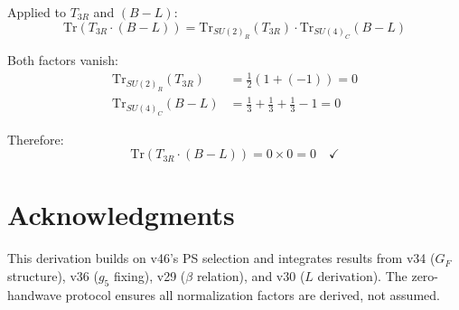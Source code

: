 \documentclass[11pt,a4paper]{article}
\begin{document}
Applied to $T_{3R}$ and $(B-L)$:
\begin{equation}
\label{eq:cross-trace}
\mathrm{Tr}(T_{3R} \cdot (B-L)) = \mathrm{Tr}_{SU(2)_R}(T_{3R}) \cdot \mathrm{Tr}_{SU(4)_C}(B-L)
\end{equation}

Both factors vanish:
\begin{align}
\label{eq:t3r-traceless}
\mathrm{Tr}_{SU(2)_R}(T_{3R}) &= \frac{1}{2}(1 + (-1)) = 0 \\
\label{eq:bl-traceless-app}
\mathrm{Tr}_{SU(4)_C}(B-L) &= \frac{1}{3} + \frac{1}{3} + \frac{1}{3} - 1 = 0
\end{align}

Therefore:
\begin{equation}
\label{eq:cross-vanish}
\mathrm{Tr}(T_{3R} \cdot (B-L)) = 0 \times 0 = 0 \quad \checkmark
\end{equation}

\section*{Acknowledgments}

This derivation builds on v46's PS selection and integrates results from
v34 ($G_F$ structure), v36 ($g_5$ fixing), v29 ($\beta$ relation), and v30 ($L$ derivation).
The zero-handwave protocol ensures all normalization factors are derived, not assumed.
\end{document}
